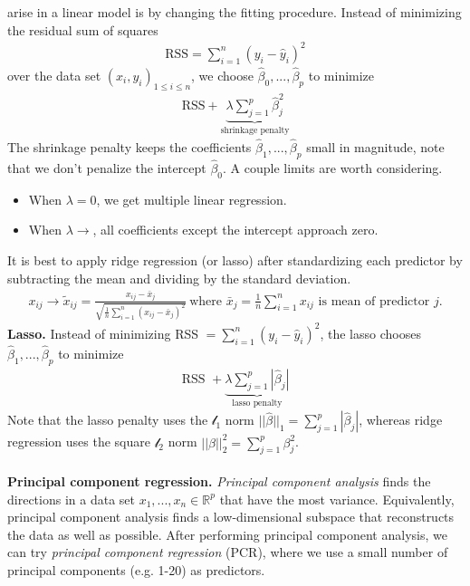 \documentclass[12pt, letterpaper]{article}
\begin{document}
arise in a linear model is by changing the fitting procedure. Instead of minimizing the residual sum
of squares 
\begin{align*}
    \text{RSS} = \sum_{i=1}^{n} (y_i-\hat y_i)^2
\end{align*}
over the data set $(x_i,y_i)_{1\le i \le n}$, we choose $\hat \beta_0, ...,\hat \beta_p$ to minimize
\begin{align*}
    \text{RSS} + \underbrace{\lambda \sum_{j=1}^{p}\hat \beta^2_j}_\text{shrinkage penalty}
\end{align*}
The shrinkage penalty keeps the coefficients $\hat \beta_1,..., \hat \beta_p$ small in magnitude, note 
that we don't penalize the intercept $\hat \beta_0$. A couple limits are worth considering.
\begin{itemize}
    \item When $\lambda = 0$, we get multiple linear regression.
    \item When $\lambda \rightarrow$, all coefficients except the intercept approach zero.
\end{itemize}
It is best to apply ridge regression (or lasso) after standardizing each predictor by subtracting the mean 
and dividing by the standard deviation.
\begin{align*}
    x_{ij}\rightarrow \tilde{x}_{ij} = \frac{x_{ij}-\bar x_j}{\sqrt{\frac 1n \sum_{i=1}^{n}(x_{ij}-\bar x_j)^2}}\ 
    \text{where } \bar{x}_j = \frac 1n \sum_{i=1}^{n}x_{ij} \text{ is mean of predictor }j.
\end{align*}
\textbf{Lasso.} Instead of minimizing RSS $= \sum_{i=1}^{n}(y_i-\hat y_i)^2$, the lasso chooses $\hat \beta_1, ..., \hat \beta_p$ to minimize
\begin{align*}
    \text{RSS } + \underbrace{\lambda\sum_{j=1}^{p}|\hat \beta_j|}_{\text{lasso penalty}}
\end{align*}
Note that the lasso penalty uses the $\mathcal{l}_1$ norm $||\hat \beta||_1 = \sum_{j=1}^{p}|\hat \beta_j|$,
whereas ridge regression uses the square $\mathcal{l}_2$ norm $||\hat \beta||_2^2= \sum_{j=1}^{p} \beta^2_j$. \\ \\
\textbf{Principal component regression.} \textit{Principal component analysis} finds the directions in 
a data set $x_1, ..., x_n \in \mathbb{R}^p$ that have the most variance. Equivalently, principal component 
analysis finds a low-dimensional subspace that reconstructs the data as well as possible. After performing 
principal component analysis, we can try \textit{principal component regression} (PCR), where we use a
small number of principal components (e.g. 1-20) as predictors.
\end{document}
